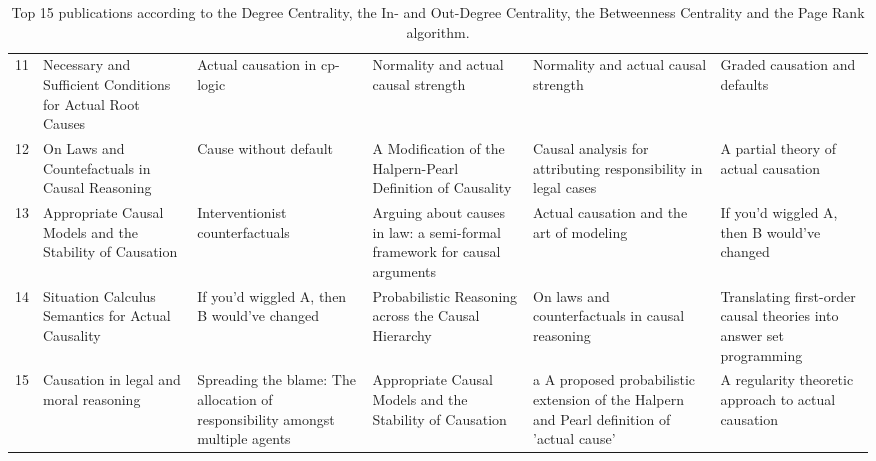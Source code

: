 \documentclass[11pt,a4paper]{book}
\theoremstyle{definition}
\theoremstyle{definition}
\theoremstyle{definition}
\theoremstyle{remark}
\begin{document}
\begin{table}
\begin{tabular}{l p{3.7cm} p{3.7cm}p{3.7cm} p{3.7cm}p{3.7cm} }
11 &         Necessary and Sufficient Conditions for Actual Root Causes &                                                                Actual causation in cp-logic &                                      Normality and actual causal strength &                                                      Normality and actual causal strength &                                                               Graded causation and defaults\\
12 &                   On Laws and Countefactuals in Causal Reasoning &                                                                       Cause without default &               A Modification of the Halpern-Pearl Definition of Causality &                             Causal analysis for attributing responsibility in legal cases &                                                         A partial theory of actual causation \\
13 &           Appropriate Causal Models and the Stability of Causation &                                                             Interventionist counterfactuals &  Arguing about causes in law: a semi-formal framework for causal arguments&                                                  Actual causation and the art of modeling &  If you'd wiggled A, then B would've changed \\
14 &                 Situation Calculus Semantics for Actual Causality & If you'd wiggled A, then B would've changed&                        Probabilistic Reasoning across the Causal Hierarchy &                                           On laws and counterfactuals in causal reasoning &                         Translating first-order causal theories into answer set programming \\
15 &                             Causation in legal and moral reasoning &              Spreading the blame: The allocation of responsibility amongst multiple agents &                   Appropriate Causal Models and the Stability of Causation &  a A proposed probabilistic extension of the Halpern and Pearl definition of 'actual cause' &                                         A regularity theoretic approach to actual causation\\
\bottomrule

\end{tabular}
\caption{Top 15 publications according to the Degree Centrality, the In- and Out-Degree Centrality, the Betweenness Centrality and the Page Rank algorithm.}
\label{tab:pub_ranking}
\end{table}
\end{document}
